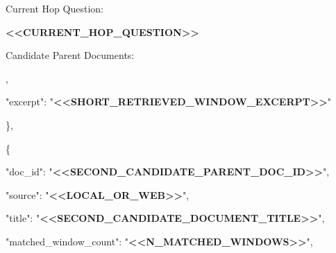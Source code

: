 \begin{tcolorbox}[colback=white, colframe=my-green, coltitle=black, parskip=5mm, title=\textbf{Document Choose}, halign=flush left, enhanced, breakable, skin first=enhanced, skin middle=enhanced, skin last=enhanced]
\begin{scriptsize}
Current Hop Question:\par
\textcolor{my-green}{\textbf{\textless{}\textless{}CURRENT\_HOP\_QUESTION\textgreater{}\textgreater{}}}\par
\mbox{}\par
Candidate Parent Documents:\par
[\par
  \{\par
    "doc\_id": "\textcolor{my-green}{\textbf{\textless{}\textless{}CANDIDATE\_PARENT\_DOC\_ID\textgreater{}\textgreater{}}}",\par
    "source": "\textcolor{my-green}{\textbf{\textless{}\textless{}LOCAL\_OR\_WEB\textgreater{}\textgreater{}}}",\par
    "title": "\textcolor{my-green}{\textbf{\textless{}\textless{}CANDIDATE\_DOCUMENT\_TITLE\textgreater{}\textgreater{}}}",\par
    "matched\_window\_count": "\textcolor{my-green}{\textbf{\textless{}\textless{}N\_MATCHED\_WINDOWS\textgreater{}\textgreater{}}}",\par
    "total\_window\_count": "\textcolor{my-green}{\textbf{\textless{}\textless{}N\_TOTAL\_WINDOWS\textgreater{}\textgreater{}}}",\par
    "best\_rank": "\textcolor{my-green}{\textbf{\textless{}\textless{}BEST\_RETRIEVAL\_RANK\textgreater{}\textgreater{}}}",\par
    "top\_queries": [\par
      "\textcolor{my-green}{\textbf{\textless{}\textless{}RETRIEVAL\_QUERY\_THAT\_FOUND\_THIS\_DOC\textgreater{}\textgreater{}}}"\par
    ],\par
    "excerpt": "\textcolor{my-green}{\textbf{\textless{}\textless{}SHORT\_RETRIEVED\_WINDOW\_EXCERPT\textgreater{}\textgreater{}}}"\par
  \},\par
  \{\par
    "doc\_id": "\textcolor{my-green}{\textbf{\textless{}\textless{}SECOND\_CANDIDATE\_PARENT\_DOC\_ID\textgreater{}\textgreater{}}}",\par
    "source": "\textcolor{my-green}{\textbf{\textless{}\textless{}LOCAL\_OR\_WEB\textgreater{}\textgreater{}}}",\par
    "title": "\textcolor{my-green}{\textbf{\textless{}\textless{}SECOND\_CANDIDATE\_DOCUMENT\_TITLE\textgreater{}\textgreater{}}}",\par
    "matched\_window\_count": "\textcolor{my-green}{\textbf{\textless{}\textless{}N\_MATCHED\_WINDOWS\textgreater{}\textgreater{}}}",\par

\end{scriptsize}
\end{tcolorbox}
